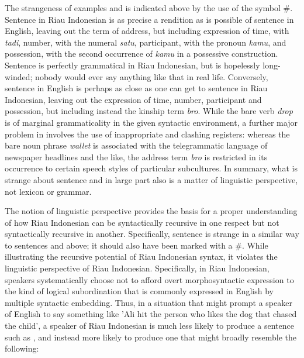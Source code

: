 \documentclass[output=paper,colorlinks,citecolor=brown
]{langscibook}
\begin{document}
The strangeness of examples  and  is indicated above by the use of the symbol \#.  Sentence  in Riau Indonesian is as precise a rendition as is possible of sentence  in English, leaving out the term of address, but including expression of time, with \textit{tadi}, number, with the numeral \textit{satu}, participant, with the pronoun \textit{kamu}, and possession, with the second occurrence of \textit{kamu} in a possessive construction.  Sentence  is perfectly grammatical in Riau Indonesian, but is hopelessly long-winded; nobody would ever say anything like that in real life.  Conversely, sentence  in English is perhaps as close as one can get to sentence  in Riau Indonesian, leaving out the expression of time, number, participant and possession, but including instead the kinship term \textit{bro}.  While the bare verb \textit{drop} is of marginal grammaticality in the given syntactic environment, a further major problem in  involves the use of inappropriate and clashing registers: whereas the bare noun phrase \textit{wallet} is associated with the telegrammatic language of newspaper headlines and the like, the address term \textit{bro} is restricted in its occurrence to certain speech styles of particular subcultures.  In summary, what is strange about sentence  and in large part also  is a matter of linguistic perspective, not lexicon or grammar.

The notion of linguistic perspective provides the basis for a proper understanding of how Riau Indonesian can be syntactically recursive in one respect but not syntactically recursive in another.  Specifically, sentence  is strange in a similar way to sentences  and  above; it should also have been marked with a \#.  While illustrating the recursive potential of Riau Indonesian syntax, it violates the linguistic perspective of Riau Indonesian.  Specifically, in Riau Indonesian, speakers systematically choose not to afford overt morphosyntactic expression to the kind of logical subordination that is commonly expressed in English by multiple syntactic embedding.  Thus, in a situation that might prompt a speaker of English to say something like 'Ali hit the person who likes the dog that chased the child', a speaker of Riau Indonesian is much less likely to produce a sentence such as , and instead more likely to produce one that might broadly resemble the following:
\end{document}
